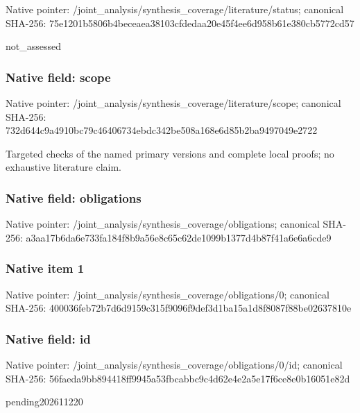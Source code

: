 \documentclass[10pt,a4paper]{article}
\begin{document}
Native pointer: /joint\_analysis/synthesi\allowbreak{}s\_coverage/literature/st\allowbreak{}atus; canonical SHA-256: 75e1201b5806b4beceaea381\allowbreak{}03cfdedaa20e45f4ee6d958b\allowbreak{}61e380cb5772cd57


not\_assessed


\subsubsection{Native field: scope}


Native pointer: /joint\_analysis/synthesi\allowbreak{}s\_coverage/literature/sc\allowbreak{}ope; canonical SHA-256: 732d644c9a4910bc79c46406\allowbreak{}734ebdc342be508a168e6d85\allowbreak{}b2ba9497049e2722


Targeted checks of the named primary versions and complete local proofs; no exhaustive literature claim.


\subsubsection{Native field: obligations}


Native pointer: /joint\_analysis/synthesi\allowbreak{}s\_coverage/obligations; canonical SHA-256: a3aa17b6da6e733fa184f8b9\allowbreak{}a56e8c65c62de1099b1377d4\allowbreak{}b87f41a6e6a6cde9



\subsubsection{Native item 1}


Native pointer: /joint\_analysis/synthesi\allowbreak{}s\_coverage/obligations/0; canonical SHA-256: 400036feb72b7d6d9159c315\allowbreak{}f9096f9def3d1ba15a1d8f80\allowbreak{}87f88be02637810e



\subsubsection{Native field: id}


Native pointer: /joint\_analysis/synthesi\allowbreak{}s\_coverage/obligations/0\allowbreak{}/id; canonical SHA-256: 56faeda9bb894418ff9945a5\allowbreak{}3fbcabbc9c4d62e4e2a5e17f\allowbreak{}6ce8e0b16051e82d


pending202611220
\end{document}
